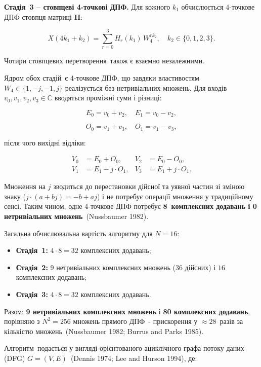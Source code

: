 \documentclass[
]{article}
\begin{document}
\textbf{Стадія~3 -- стовпцеві 4-точкові ДПФ.} Для кожного \(k_{1}\)
обчислюється 4-точкове ДПФ стовпця матриці \(\mathbf{H}\):

\[X(4k_{1} + k_{2}) = \sum_{r = 0}^{3}H_{r}(k_{1})\, W_{4}^{rk_{2}},\quad k_{2} \in \{ 0,1,2,3\}.\]

Чотири стовпцевих перетворення~також є взаємно незалежними.

Ядром обох стадій~є 4-точкове ДПФ, що завдяки властивостям
\(W_{4} \in \{ 1, - j, - 1,j\}\) реалізується без нетривіальних множень.
Для входів \(v_{0},v_{1},v_{2},v_{3}\mathbb{\in C}\) вводяться проміжні
суми і різниці:

\[E_{0} = v_{0} + v_{2},\quad E_{1} = v_{0} - v_{2},\]

\[O_{0} = v_{1} + v_{3},\quad O_{1} = v_{1} - v_{3},\]

після чого вихідні відліки:

\[\begin{aligned}
V_{0} & = E_{0} + O_{0}, & V_{2} & = E_{0} - O_{0}, \\
V_{1} & = E_{1} - j \cdot O_{1}, & V_{3} & = E_{1} + j \cdot O_{1}.
\end{aligned}\]

Множення на \(j\) зводиться до перестановки дійсної та уявної частин зі
зміною знаку (\(j \cdot (a + bj) = - b + aj\)) і не потребує операції
множення у традиційному сенсі. Таким чином, одне 4-точкове ДПФ потребує
\textbf{8~комплексних додавань і 0 нетривіальних множень}~(Nussbaumer
1982).

Загальна обчислювальна вартість алгоритму для \(N = 16\):

\begin{itemize}
\item
  \textbf{Стадія~1:} \(4 \cdot 8 = 32\) комплексних додавань;
\item
  \textbf{Стадія~2:} \(9\) нетривіальних комплексних множень (\(36\)
  дійсних) і \(16\) комплексних додавань;
\item
  \textbf{Стадія~3:} \(4 \cdot 8 = 32\) комплексних додавань.
\end{itemize}

Разом: \textbf{9 нетривіальних комплексних множень} і \textbf{80
комплексних додавань}, порівняно з \(N^{2} = 256\) множень прямого ДПФ~-
прискорення у \(\approx 28\)~разів за кількістю множень~(Nussbaumer
1982; Burrus and Parks 1985).

Алгоритм~подається у вигляді орієнтованого ациклічного графа потоку
даних (DFG) \(G = (V,E)\)~(Dennis 1974; Lee and Hurson 1994), де:
\end{document}
